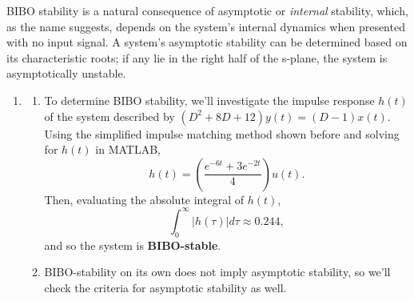 \documentclass{article}
\begin{document}
\begin{enumerate}[label=\thesubsubsection]
					BIBO stability is a natural consequence of asymptotic or \textit{internal} stability, which, as the name suggests, depends on the system's internal dynamics when presented with no input signal. A system's asymptotic stability can be determined based on its characteristic roots; if any lie in the right half of the s-plane, the system is asymptotically unstable.
					\begin{enumerate}[label=\alph*)]
						\item 
							\begin{enumerate}[label=(\roman*)]
								\item To determine BIBO stability, we'll investigate the impulse response \(h(t)\) of the system described by \((D^2 + 8D + 12)y(t) = (D-1)x(t)\). Using the simplified impulse matching method shown before and solving for \(h(t)\) in MATLAB, 
									\[
										h(t) = (\frac{e^{-6t} + 3e^{-2t}}{4})u(t).
									\]
									Then, evaluating the absolute integral of \(h(t)\),
									\[
									  \int_{0}^{\infty}|h(\tau)|d\tau \approx 0.244,
									\]
									and so the system is \textbf{BIBO-stable}.

								\item BIBO-stability on its own does not imply asymptotic stability, so we'll check the criteria for asymptotic stability as well.
									

\end{enumerate}
\end{enumerate}
\end{enumerate}
\end{document}
